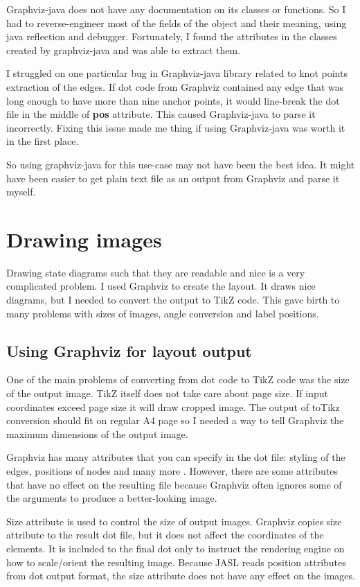 \documentclass{ctuthesis}
\begin{document}
Graphviz-java does not have any documentation on its classes or functions. So I had to reverse-engineer most of the fields of the object and their meaning, using java reflection and debugger. Fortunately, I found the attributes in the classes created by graphviz-java and was able to extract them. 

I struggled on one particular bug in Graphviz-java library related to knot points extraction of the edges. If dot code from Graphviz contained any edge that was long enough to have more than nine anchor points, it would line-break the dot file in the middle of \textbf{pos} attribute. This caused Graphviz-java to parse it incorrectly. Fixing this issue made me thing if using Graphviz-java was worth it in the first place.

So using graphviz-java for this use-case may not have been the best idea. It might have been easier to get plain text file as an output from Graphviz and parse it myself. 

\chapter{Drawing images}
Drawing state diagrams such that they are readable and nice is a very complicated problem. I used Graphviz to create the layout. It draws nice diagrams, but I needed to convert the output to TikZ code. This gave birth to many problems with sizes of images, angle conversion and label positions. 

\section{Using Graphviz for layout output}
\label{sec:problems_graphviz}
One of the main problems of converting from dot code to TikZ code was the size of the output image. TikZ itself does not take care about page size. If input coordinates exceed page size it will draw cropped image. The output of toTikz conversion should fit on regular A4 page so I needed a way to tell Graphviz the maximum dimensions of the output image. 

Graphviz has many attributes that you can specify in the dot file: styling of the edges, positions of nodes and many more \cite{dot-notation}. However, there are some attributes that have no effect on the resulting file because Graphviz often ignores some of the arguments to produce a better-looking image.

Size attribute is used to control the size of output images. Graphviz copies size attribute to the result dot file, but it does not affect the coordinates of the elements. It is included to the final dot only to instruct the rendering engine on how to scale/orient the resulting image. Because JASL reads position attributes from dot output format, the size attribute does not have any effect on the images.
\end{document}
